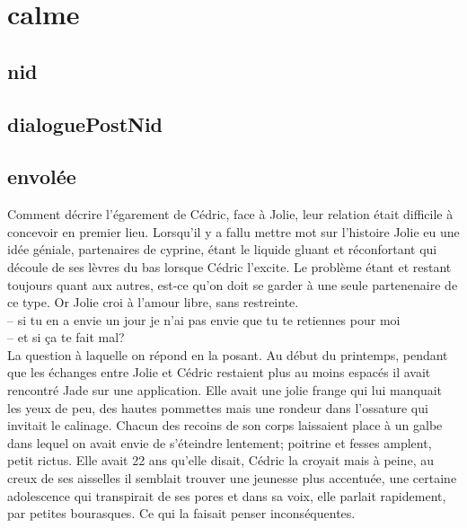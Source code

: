 \documentclass{article}
\begin{document}
\section{calme}

\subsection{nid}

\clearpage


\subsection{dialoguePostNid}

\clearpage

\subsection{envolée}

Comment décrire l'égarement de Cédric, face à Jolie, leur relation était
difficile à concevoir en premier lieu. Lorsqu'il y a fallu mettre mot sur
l'histoire Jolie eu une idée géniale, partenaires de cyprine, étant le liquide
gluant et réconfortant qui découle de ses lèvres du bas lorsque Cédric l'excite.
Le problème étant et restant toujours quant aux autres, est-ce qu'on doit se
garder à une seule partenenaire de ce type. Or Jolie croi à l'amour libre, sans
restreinte.\\

-- si tu en a envie un jour je n'ai pas envie que tu te retiennes pour moi\\
-- et si ça te fait mal?\\

La question à laquelle on répond en la posant. Au début du printemps, pendant
que les échanges entre Jolie et Cédric restaient plus au moins espacés il avait
rencontré Jade sur une application. Elle avait une jolie frange qui lui manquait
les yeux de peu, des hautes pommettes mais une rondeur dans l'ossature qui
invitait le calinage. Chacun des recoins de son corps laissaient place à un
galbe dans lequel on avait envie de s'éteindre lentement; poitrine et fesses
amplent, petit rictus. Elle avait 22 ans qu'elle disait, Cédric la croyait mais
à peine, au creux de ses aisselles il semblait trouver une jeunesse plus
accentuée, une certaine adolescence qui transpirait de ses pores et dans sa
voix, elle parlait rapidement, par petites bourasques. Ce qui la faisait penser
inconséquentes.\\
\end{document}
